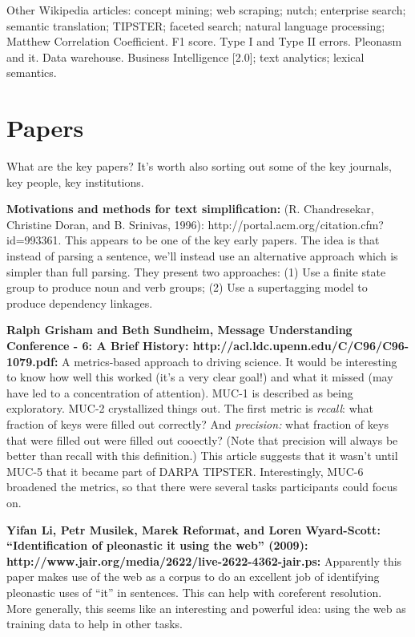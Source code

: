 Other Wikipedia articles: concept mining; web scraping; nutch;
enterprise search; semantic translation; TIPSTER; faceted search;
natural language processing; Matthew Correlation Coefficient. F1
score.  Type I and Type II errors.  Pleonasm and it.  Data warehouse.
Business Intelligence [2.0]; text analytics; lexical semantics.

\section{Papers}

What are the key papers?  It's worth also sorting out some of the key
journals, key people, key institutions.

\textbf{Motivations and methods for text simplification:}
(R. Chandresekar, Christine Doran, and B. Srinivas, 1996):
http://portal.acm.org/citation.cfm?id=993361.  This appears to be one
of the key early papers.  The idea is that instead of parsing a
sentence, we'll instead use an alternative approach which is simpler
than full parsing.  They present two approaches: (1) Use a finite
state group to produce noun and verb groups; (2) Use a supertagging
model to produce dependency linkages.

\textbf{Ralph Grisham and Beth Sundheim, Message Understanding
  Conference - 6: A Brief History:
  http://acl.ldc.upenn.edu/C/C96/C96-1079.pdf:} A metrics-based
approach to driving science.  It would be interesting to know how well
this worked (it's a very clear goal!) and what it missed (may have led
to a concentration of attention).  MUC-1 is described as being
exploratory.  MUC-2 crystallized things out.  The first metric is
\emph{recall}: what fraction of keys were filled out correctly?  And
\emph{precision:} what fraction of keys that were filled out were
filled out cooectly?  (Note that precision will always be better than
recall with this definition.)  This article suggests that it wasn't
until MUC-5 that it became part of DARPA TIPSTER.  Interestingly,
MUC-6 broadened the metrics, so that there were several tasks
participants could focus on.

\textbf{Yifan Li, Petr Musilek, Marek Reformat, and Loren Wyard-Scott:
  ``Identification of pleonastic it using the web'' (2009):
  http://www.jair.org/media/2622/live-2622-4362-jair.ps:} Apparently
this paper makes use of the web as a corpus to do an excellent job of
identifying pleonastic uses of ``it'' in sentences.  This can help
with coreferent resolution.  More generally, this seems like an
interesting and powerful idea: using the web as training data to help
in other tasks.

